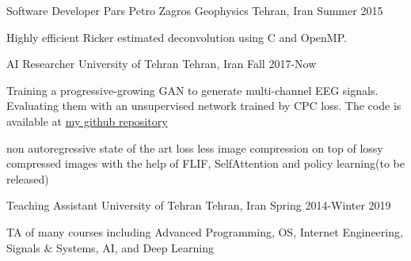 \begin{cventries}
  \cventry
    {Software Developer} %
    {Pars Petro Zagros Geophysics} %
    {Tehran, Iran} %
    {Summer 2015} %
    {
      \begin{cvitems} %
        \item {Highly efficient Ricker estimated deconvolution using C and OpenMP.}
      \end{cvitems}
    }


\end{cventries}



\begin{cventries}

 \cventry
    {AI Researcher} %
    {University of Tehran} %
    {Tehran, Iran} %
    {Fall 2017-Now} %
    {
      \begin{cvitems} %
      	\item {Training a progressive-growing GAN to generate multi-channel EEG signals. Evaluating them with an unsupervised network trained by CPC loss. The code is available at \href{https://github.com/Separius/EEG-GAN}{my github repository}}      
      	\item {non autoregressive state of the art loss less image compression on top of lossy compressed images with the help of FLIF, SelfAttention and policy learning(to be released)}
      \end{cvitems}
    }

 \cventry
    {Teaching Assistant} %
    {University of Tehran} %
    {Tehran, Iran} %
    {Spring 2014-Winter 2019} %
    {
      \begin{cvitems} %
        \item {TA of many courses including Advanced Programming, OS, Internet Engineering, Signals \& Systems, AI, and Deep Learning}
      \end{cvitems}
    }
\end{cventries}
